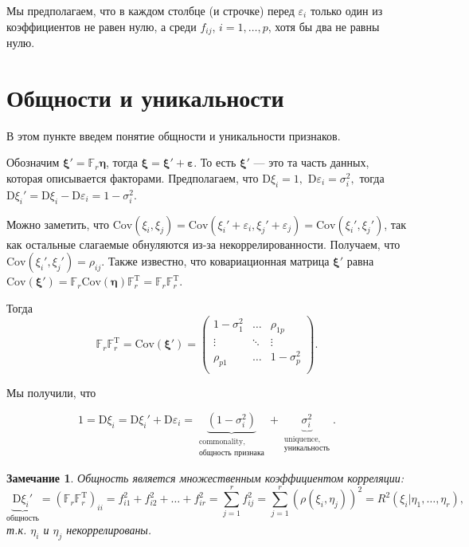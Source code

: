 \documentclass[specialist, 12pt,
subf, %
href, colorlinks=true,
substylefile = spbu.rtx,
]{disser}
\newtheorem{remark}{Замечание}
\begin{document}
Мы предполагаем, что в каждом столбце (и строчке) перед $\varepsilon_i$ только один из коэффициентов не равен нулю, а среди $f_{ij}$, $i=1,\ldots,p$, хотя бы два не равны нулю.

\section{Общности и уникальности}

В этом пункте введем понятие общности и уникальности признаков.

Обозначим $\bm\xi'= \mathbb{F}_r \bm\eta$, тогда $\bm\xi = \bm\xi'+\bm\varepsilon$. То есть $\bm\xi'$ --- это та часть данных, которая описывается факторами. Предполагаем, что $\mathrm{D}\xi_i=1,$ $\mathrm{D}\varepsilon_i=\sigma_i^2,$ тогда $\mathrm{D}\xi_i'=\mathrm{D}\xi_i-\mathrm{D}\varepsilon_i= 1-\sigma_i^2.$

Можно заметить, что $\text{Cov}(\xi_i, \xi_j)=\text{Cov}(\xi_i'+\varepsilon_i, \xi_j'+\varepsilon_j) = \text{Cov}(\xi_i', \xi_j')$, так как остальные слагаемые обнуляются из-за некоррелированности. Получаем, что $\text{Cov}(\xi_i', \xi_j')=\rho_{ij}$. Также известно, что ковариационная матрица $\bm\xi'$ равна $\text{Cov} (\bm\xi') = \mathbb{F}_r \text{Cov}(\bm\eta) \mathbb{F}_r^\mathrm{T} = \mathbb{F}_r\mathbb{F}_r^\mathrm{T}.$

Тогда
\begin{equation*}
\mathbb{F}_r\mathbb{F}_r^\mathrm{T} = \text{Cov} (\bm\xi') =
\left(\begin{matrix}
1-\sigma_1^2 & \ldots & \rho_{1p} \\
\vdots & \ddots & \vdots \\
\rho_{p1} & \ldots & 1-\sigma_p^2 \\
\end{matrix}  \right).
\end{equation*}

Мы получили, что

\begin{equation*}
1 = \mathrm{D}\xi_i = \mathrm{D}\xi_i'+\mathrm{D}\varepsilon_i = \underbrace{(1-\sigma_i^2)}_{\substack{\text{commonality}, \\  \text{общность признака}}} + \underbrace{\sigma_i^2}_{\substack{\text{uniquence}, \\  \text{уникальность}}}.
\end{equation*}


\begin{remark}
 Общность является множественным коэффициентом корреляции:
 \begin{equation*}
\underbrace{\mathrm{D}\xi_i'}_{\text{общность}} = (\mathbb{F}_r\mathbb{F}_r^\mathrm{T})_{ii} = f_{i1}^2+f_{i2}^2+\ldots+f_{ir}^2 = \sum\limits_{j=1}^r f_{ij}^2 = \sum \limits_{j=1}^r (\rho(\xi_i,\eta_j))^2 = R^2(\xi_i | \eta_1,\ldots, \eta_r),
 \end{equation*}
 т.к. $\eta_i$ и $\eta_j$ некоррелированы.
\end{remark}
\end{document}

